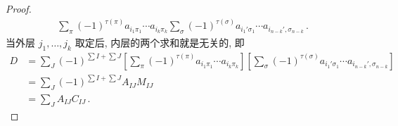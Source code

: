 \documentclass[UTF8]{ctexart}
\begin{document}
\begin{proof}
\begin{align*}
        \sum_{\pi} (-1)^{\tau(\pi)} a_{i_1 \pi_1} \cdots a_{i_k \pi_k}
        \sum_{\sigma} (-1)^{\tau(\sigma)}   a_{i_1' \sigma_1} \cdots a_{i_{n-k}', \sigma_{n-k}} \,.
    \end{align*}
    当外层 $ j_1, \dots, j_k $ 取定后, 内层的两个求和就是无关的, 即
    \begin{align*}
        D &= \sum_{J} (-1)^{\sum I + \sum J}
        \left[ \sum_{\pi} (-1)^{\tau(\pi)} a_{i_1 \pi_1} \cdots a_{i_k \pi_k} \right]
        \left[ \sum_{\sigma} (-1)^{\tau(\sigma)} a_{i_1' \sigma_1} \cdots a_{i_{n-k}', \sigma_{n-k}} \right] \\
        &= \sum_{J} (-1)^{\sum I + \sum J} A_{IJ} M_{IJ} \\
        &= \sum_{J} A_{IJ} C_{IJ} \,.
    \end{align*}
\end{proof}
\end{document}
